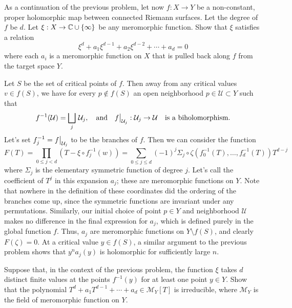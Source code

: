 \documentclass{lkx_pset}
\begin{document}
\begin{problem}{3}
  As a continuation of the previous problem, let now $f : X \to Y$ be a non-constant, proper holomorphic map between connected Riemann surfaces. Let the degree of $f$ be $d$. Let $\xi : X \to \mathbb{C} \cup \{\infty\}$ be any meromorphic function. Show that $\xi$ satisfies a relation
  \[
    \xi^d + a_1\xi^{d-1} + a_2\xi^{d-2}+\cdots+a_d = 0
  \]
  where each $a_i$ is a meromorphic function on $X$ that is pulled back along $f$ from the target space $Y$.
\end{problem}

\begin{solution}
  Let $S$ be the set of critical points of $f$. Then away from any critical values $v\in f(S)$, we have for every $p\not\in f(S)$ an open neighborhood $p\in \mathcal{U} \subset Y$ such that
  \[
    f^{-1}(\mathcal{U})=\bigsqcup_j\, \mathcal{U}_j, \quad \textrm{and}\quad \restr{f}{\mathcal{U}_j} : \mathcal{U}_j \to \mathcal{U}\quad\textrm{is a biholomorphism.}
  \]
  Let's set $f_j^{-1} = \restr{f}{\mathcal{U}_j}$ to be the branches of $f$. Then we can consider the function
  \[
    F(T) = \prod_{0\leq j< d} (T-\xi\circ f_j^{-1}(w)) = \sum_{0\leq j \leq d} (-1)^{j}\Sigma_j\circ \zeta(f_0^{-1}(T), \ldots, f_d^{-1}(T)) T^{d-j}
  \]
  where $\Sigma_j$ is the elementary symmetric function of degree $j$. Let's call the coefficient of $T^j$ in this expansion $a_j$; these are meromorphic functions on $Y$. Note that nowhere in the definition of these coordinates did the ordering of the branches come up, since the symmetric functions are invariant under any permutations.
  Similarly, our initial choice of point $p\in Y$ and neighborhood $\mathcal{U}$ makes no difference in the final expression for $a_j$, which is defined purely in the global function $f$. Thus, $a_j$ are meromorphic functions on $Y\setminus f(S)$, and clearly $F(\zeta)=0$. At a critical value $y\in f(S)$, a similar argument to the previous problem shows that $y^n a_j(y)$ is holomorphic for sufficiently large $n$.
\end{solution}

\begin{problem}{4}
  Suppose that, in the context of the previous problem, the function $\xi$ takes $d$ distinct finite values at the points $f^{-1}(y)$ for at least one point $y\in Y$. Show that the polynomial $T^d + a_1 T^{d-1}+\cdots +a_d\in \mathcal{M}_Y[T]$ is irreducible, where $\mathcal{M}_Y$ is the field of meromorphic function on $Y$.
\end{problem}
\end{document}
